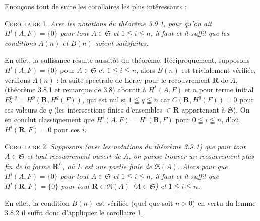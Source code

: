 Enonçons tout de suite les corollaires les plus intéressants :

\textsc{Corollaire 1.} \textit{Avec les notations du théorème \textup{3.9.1},
pour qu'on ait $H^i(A,F)=\{0\}$ pour tout $A\in\mathfrak S$ et
$1\leqq i\leqq n$, il faut et il suffit que les conditions $A(n)$ et $B(n)$
soient satisfaites.}

En effet, la suffisance résulte aussitôt du théorème.
Réciproquement, supposons $H^i(A,F)=\{0\}$ pour $A\in\mathfrak S$ et
$1\leqq i\leqq n$, alors $B(n)$ est trivialement vérifiée, vérifions $A(n)$ :
la suite spectrale de Leray pour le recouvrement $\mathbf R$ de $A$,
(théorème 3.8.1 et remarque de 3.8) aboutit à $H^*(A,F)$ et a pour terme
initial
$E_2^{p,q}=H^p(\mathbf R,H^q(F))$,
qui est nul si $1\leqq q\leqq n$ car $C(\mathbf R,H^q(F))=0$ pour ses valeurs
de $q$ (les intersections finies d'ensembles $\in\mathbf R$ appartenant à
$\mathfrak S$). On en conclut classiquement que
$H^i(A,F)=H^i(\mathbf R,F)$ pour $0\leqq i\leqq n$, d'oû
$H^i(\mathbf R,F)=0$ pour ces $i$.

\textsc{Corollaire 2.} \textit{Supposons \textup{(}avec les notations du
théorème \textup{3.9.1)} que pour tout $A\in\mathfrak S$ et tout recouvrement ouvert de
$A$, on puisse trouver un recouvrement plus fin de la forme $\mathbf R^L$, oû
$L$ est une partie finie de $\mathfrak R(A)$. Alors pour que
$H^i(A,F)=\{0\}$ pour tout $A\in\mathfrak S$ et $1\leqq i\leqq n$, il faut et
il suffit que $H^i(\mathbf R,F)=\{0\}$ pour tout
$\mathbf R\in\mathfrak R(A)$ \textup{(}$A\in\mathfrak S$\textup{)} et $1\leqq i\leqq n$.}

En effet, la condition $B(n)$ est vérifiée (quel que soit $n>0$) en vertu du
lemme 3.8.2 il suffit donc d'appliquer le corollaire 1.

